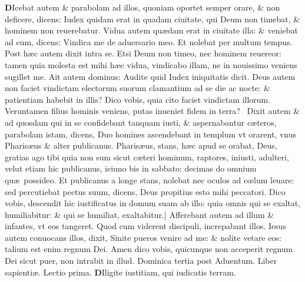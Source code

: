 \documentclass[a5paper,10pt]{book}
\def\leftmarginnote{%
	\lrmarginnote{\hskip -\marginparsep \hskip -6.5em}}
\def\rightmarginnote{%
	\lrmarginnote{\hskip\columnwidth \hskip -1em}}
\def\ae{æ}
\def\oe{œ}
\begin{document}
\begin{multicols*}{2}
\lettrine[lines=2]{\bfseries \color{red} D}{}Icebat\leftmarginnote{\begin{flushright}c. 18.\end{flushright}} autem \& parabolam ad illos, quoniam oportet semper orare, \& non deficere, dicens: Iudex quidam erat in quadam ciuitate, qui Deum non timebat, \& hominem non reuerebatur.
Vidua autem qu\ae dam erat in ciuitate illa: \& veniebat ad eum, dicens: Vindica me de aduersario meo.
Et nolebat per multum tempus. Post h\ae c autem dixit intra se. Etsi Deum non timeo, nec hominem reuereor: tamen quia molesta est mihi h\ae c vidua, vindicabo illam, ne in nouissimo veniens sugillet me.
Ait autem dominus: Audite quid Iudex iniquitatis dicit. Deus autem non faciet vindictam electorum suorum clamantium ad se die ac nocte: \& patientiam habebit in illis?
Dico vobis, quia cito faciet vindictam illorum. Veruntamen filius hominis veniens, putas inueniet fidem in terra? \textdagger \ 
Dixit\leftmarginnote{\begin{flushright}B\end{flushright}} autem \& ad quosdam qui in se confidebant tanquam iusti, \& aspernabantur c\ae teros, parabolam istam, dicens, Duo homines ascendebant in templum vt orarent, vnus Pharis\ae us \& alter publicanus.
Pharis\ae us, stans, h\ae c apud se orabat, Deus, gratias ago tibi quia non sum sicut c\ae teri hominum, raptores, iniusti, adulteri, velut etiam hic publicanus, ieiuno bis in sabbato: decimas do omnium qu\ae \ possideo.
Et publicanus a longe stans, nolebat nec oculos ad c\oe lum leuare: sed percutiebat pectus suum, dicens, Deus propitius esto mihi peccatori.
Dico vobis, descendit hic iustificatus in domum suam ab illo: quia omnis qui se exaltat, humiliabitur: \& qui se\rightmarginnote{C} humiliat, exaltabitur.]
Afferebant autem ad illum \& infantes, vt eos tangeret. Quod cum viderent discipuli, increpabant illos.
Iesus autem conuocans illos, dixit, Sinite pueros venire ad me: \& nolite vetare eos: talium est enim regnum Dei.
Amen dico vobis, quicunque non acceperit regnum Dei sicut puer, non intrabit in illud.
\newline \textswab{C} \color{red} \hypertarget{SUN-TERTIA-POST-ADV}{Dominica tertia} post Aduentum. \color{black}
\bookmark[rellevel=-1,dest=SUN-TERTIA-POST-ADV]{DOMINICA III POST ADVENTVM}
\newline \color{red} Liber sapienti\ae . \hfill Lectio prima. \color{black}
\vspace{-1.25em}
\lettrine[lines=2]{\bfseries D}{}Iligite\rightmarginnote{ca. 1.} iustitiam, qui iudicatis terram.

\end{multicols*}
\end{document}
